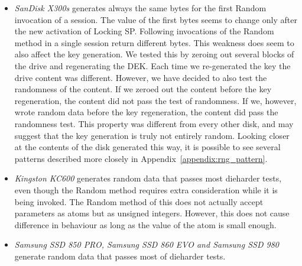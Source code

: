 \begin{itemize}
    \item \emph{SanDisk X300s} generates always the same bytes for the first Random invocation of a session. The value of the first bytes seems to change only after the new activation of Locking SP. Following invocations of the Random method in a single session return different bytes. This weakness does seem to also affect the key generation. We tested this by zeroing out several blocks of the drive and regenerating the DEK. Each time we re-generated the key the drive content was different. However, we have decided to also test the randomness of the content. If we zeroed out the content before the key regeneration, the content did not pass the test of randomness. If we, however, wrote random data before the key regeneration, the content did pass the randomness test. This property was different from every other disk, and may suggest that the key generation is truly not entirely random. Looking closer at the contents of the disk generated this way, it is possible to see several patterns described more closely in Appendix~\ref{appendix:rng_pattern}.%
    \item \emph{Kingston KC600} generates random data that passes most dieharder tests, even though the Random method requires extra consideration while it is being invoked. The Random method of this does not actually accept parameters as atoms but as unsigned integers. However, this does not cause difference in behaviour as long as the value of the atom is small enough.  %
    \item \emph{Samsung SSD 850 PRO, Samsung SSD 860 EVO and Samsung SSD 980} generate random data that passes most of  dieharder tests. %
\end{itemize}
